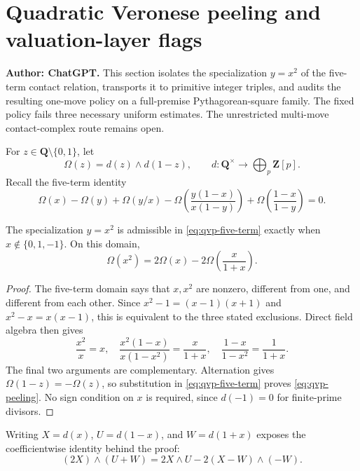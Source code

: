 \section{Quadratic Veronese peeling and valuation-layer flags}
\label{sec:quadratic-veronese-peeling}

\noindent\textbf{Author: ChatGPT.}
This section isolates the specialization $y=x^2$ of the five-term contact
relation, transports it to primitive integer triples, and audits the
resulting one-move policy on a full-premise Pythagorean-square family.  The
fixed policy fails three necessary uniform estimates.  The unrestricted
multi-move contact-complex route remains open.

For $z\in\mathbf Q\setminus\{0,1\}$, let
\[
 \Omega(z)=d(z)\wedge d(1-z),
 \qquad d:\mathbf Q^\times\longrightarrow
   \bigoplus_p\mathbf Z[p].
\]
Recall the five-term identity
\begin{equation}
 \Omega(x)-\Omega(y)+\Omega(y/x)
 -\Omega\!\left(\frac{y(1-x)}{x(1-y)}\right)
 +\Omega\!\left(\frac{1-x}{1-y}\right)=0.
 \label{eq:qvp-five-term}
\end{equation}

\begin{theorem}
\label{thm:qvp-peeling}
The specialization $y=x^2$ is admissible in
\eqref{eq:qvp-five-term} exactly when
$x\notin\{0,1,-1\}$.  On this domain,
\begin{equation}
 \Omega(x^2)=2\Omega(x)
 -2\Omega\!\left(\frac{x}{1+x}\right).
 \label{eq:qvp-peeling}
\end{equation}
\end{theorem}

\begin{proof}
The five-term domain says that $x,x^2$ are nonzero, different from one, and
different from each other.  Since
$x^2-1=(x-1)(x+1)$ and $x^2-x=x(x-1)$, this is equivalent to the three
stated exclusions.  Direct field algebra then gives
\[
 \frac{x^2}{x}=x,
 \quad
 \frac{x^2(1-x)}{x(1-x^2)}=\frac{x}{1+x},
 \quad
 \frac{1-x}{1-x^2}=\frac1{1+x}.
\]
The final two arguments are complementary.  Alternation gives
$\Omega(1-z)=-\Omega(z)$, so substitution in
\eqref{eq:qvp-five-term} proves \eqref{eq:qvp-peeling}.  No sign condition on
$x$ is required, since $d(-1)=0$ for finite-prime divisors.
\end{proof}

Writing $X=d(x)$, $U=d(1-x)$, and $W=d(1+x)$ exposes the coefficientwise
identity behind the proof:
\begin{equation}
 (2X)\wedge(U+W)
 =2X\wedge U-2(X-W)\wedge(-W).
 \label{eq:qvp-vector}
\end{equation}

